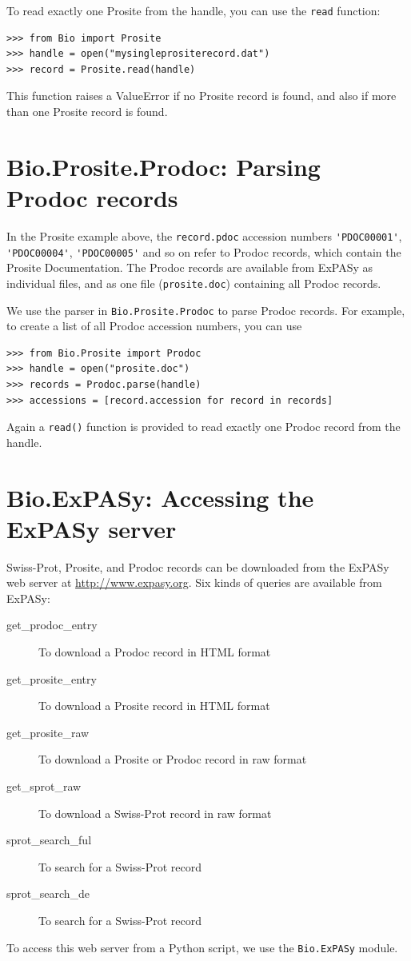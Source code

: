 \documentclass{report}
\begin{document}
To read exactly one Prosite from the handle, you can use the \verb|read| function:
\begin{verbatim}
>>> from Bio import Prosite
>>> handle = open("mysingleprositerecord.dat")
>>> record = Prosite.read(handle)
\end{verbatim}
This function raises a ValueError if no Prosite record is found, and also if more than one Prosite record is found.

\section{Bio.Prosite.Prodoc: Parsing Prodoc records}

In the Prosite example above, the \verb|record.pdoc| accession numbers \verb|'PDOC00001'|, \verb|'PDOC00004'|, \verb|'PDOC00005'| and so on refer to Prodoc records, which contain the Prosite Documentation. The Prodoc records are available from ExPASy as individual files, and as one file (\verb|prosite.doc|) containing all Prodoc records.

We use the parser in \verb|Bio.Prosite.Prodoc| to parse Prodoc records. For example, to create a list of all Prodoc accession numbers, you can use

\begin{verbatim}
>>> from Bio.Prosite import Prodoc
>>> handle = open("prosite.doc")
>>> records = Prodoc.parse(handle)
>>> accessions = [record.accession for record in records]
\end{verbatim}

Again a \verb|read()| function is provided to read exactly one Prodoc record from the handle.

\section{Bio.ExPASy: Accessing the ExPASy server}

Swiss-Prot, Prosite, and Prodoc records can be downloaded from the ExPASy web server at \url{http://www.expasy.org}. Six kinds of queries are available from ExPASy:
\begin{description}
\item[get\_prodoc\_entry]To download a Prodoc record in HTML format
\item[get\_prosite\_entry]To download a Prosite record in HTML format
\item[get\_prosite\_raw]To download a Prosite or Prodoc record in raw format
\item[get\_sprot\_raw]To download a Swiss-Prot record in raw format
\item[sprot\_search\_ful]To search for a Swiss-Prot record
\item[sprot\_search\_de]To search for a Swiss-Prot record
\end{description}
To access this web server from a Python script, we use the \verb|Bio.ExPASy| module.
\end{document}
